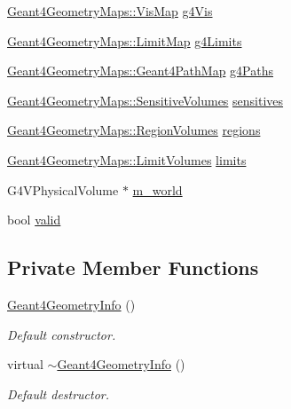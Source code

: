 \begin{DoxyCompactItemize}
\item 
\hyperlink{namespace_d_d4hep_1_1_simulation_1_1_geant4_geometry_maps_af7bb137248b77047dc34ff68d67225eb}{Geant4GeometryMaps::VisMap} \hyperlink{class_d_d4hep_1_1_simulation_1_1_geant4_geometry_info_a1dc6d3c046072b0a6455c00e7fc76269}{g4Vis}
\item 
\hyperlink{namespace_d_d4hep_1_1_simulation_1_1_geant4_geometry_maps_a338013d6709b82358b8e2490cdba0ed2}{Geant4GeometryMaps::LimitMap} \hyperlink{class_d_d4hep_1_1_simulation_1_1_geant4_geometry_info_a6005f56c4ca13d015288ae645e58df69}{g4Limits}
\item 
\hyperlink{namespace_d_d4hep_1_1_simulation_1_1_geant4_geometry_maps_a3d68bbc4e8d7a581a15f66d773dac6e7}{Geant4GeometryMaps::Geant4PathMap} \hyperlink{class_d_d4hep_1_1_simulation_1_1_geant4_geometry_info_a526d06afb77ac403965f2bb6c55998de}{g4Paths}
\item 
\hyperlink{namespace_d_d4hep_1_1_simulation_1_1_geant4_geometry_maps_a4b4bd41ff250c41737c7a73223fab910}{Geant4GeometryMaps::SensitiveVolumes} \hyperlink{class_d_d4hep_1_1_simulation_1_1_geant4_geometry_info_ab8c6e7272ad7cf326e06e5ea1f200418}{sensitives}
\item 
\hyperlink{namespace_d_d4hep_1_1_simulation_1_1_geant4_geometry_maps_a9fc457ad93d6235197e7e1ab013d1f56}{Geant4GeometryMaps::RegionVolumes} \hyperlink{class_d_d4hep_1_1_simulation_1_1_geant4_geometry_info_ad224a954b07a8662bb57f3ee0355cdfa}{regions}
\item 
\hyperlink{namespace_d_d4hep_1_1_simulation_1_1_geant4_geometry_maps_a3b9008449a71468a115373b9819457df}{Geant4GeometryMaps::LimitVolumes} \hyperlink{class_d_d4hep_1_1_simulation_1_1_geant4_geometry_info_a913c884fc30046a6eb65702d11f4383f}{limits}
\item 
G4VPhysicalVolume $\ast$ \hyperlink{class_d_d4hep_1_1_simulation_1_1_geant4_geometry_info_afac417dc2da0efb0dafa60863a56856f}{m\_\-world}
\item 
bool \hyperlink{class_d_d4hep_1_1_simulation_1_1_geant4_geometry_info_a0bc71f53d762f58ec47c76dc5db8b075}{valid}
\end{DoxyCompactItemize}
\subsection*{Private Member Functions}
\begin{DoxyCompactItemize}
\item 
\hyperlink{class_d_d4hep_1_1_simulation_1_1_geant4_geometry_info_a1da4666f8da102d02b986becb980dcb9}{Geant4GeometryInfo} ()
\begin{DoxyCompactList}\small\item\em Default constructor. \item\end{DoxyCompactList}\item 
virtual \hyperlink{class_d_d4hep_1_1_simulation_1_1_geant4_geometry_info_ab6da85b84ee74c106b5d4713dc5ccaef}{$\sim$Geant4GeometryInfo} ()
\begin{DoxyCompactList}\small\item\em Default destructor. \item\end{DoxyCompactList}\end{DoxyCompactItemize}
